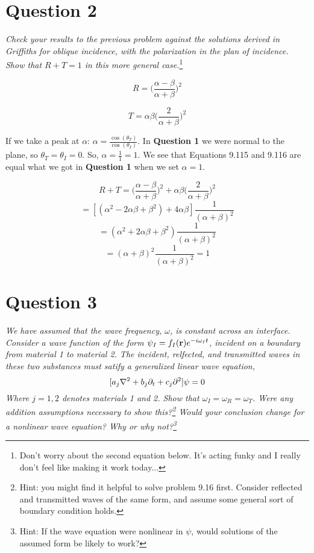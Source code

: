 \documentclass[12pt]{article}
\begin{document}
\section*{Question 2}
\emph{Check your results to the previous problem against the solutions derived in Griffiths for oblique incidence, with the polarization in the plan of incidence. Show that $R + T = 1$ in this more general case.}\footnote{Don't worry about the second equation below. It's acting funky and I really don't feel like making it work today...}\bigskip

\begin{equation}
	\tag{Equation 9.115}
	R = \Big(\frac{\alpha - \beta}{\alpha + \beta}\Big)^2
	\label{eq:9.115}
\end{equation}

\begin{equation}
	\tag{Equation 9.116}
	T = \alpha \beta \Big(\frac{2}{\alpha + \beta}\Big)^2
	\label{eq:9.116}
\end{equation}

If we take a peak at $\alpha$: $\alpha = \frac{\cos(\theta_T)}{\cos(\theta_I)}$. In \textbf{Question 1} we were normal to the plane, so $\theta_T = \theta_I = 0$. So, $\alpha = \frac{1}{1} = 1$. We see that Equations 9.115 and 9.116 are equal what we got in \textbf{Question 1} when we set $\alpha = 1$.\bigskip

\[R + T = \Big(\frac{\alpha - \beta}{\alpha + \beta}\Big)^2 + \alpha \beta \Big(\frac{2}{\alpha + \beta}\Big)^2\]
\[ = [(\alpha^2 - 2\alpha\beta + \beta^2) + 4 \alpha \beta]\frac{1}{(\alpha + \beta)^2}\]
\[ = (\alpha^2 + 2\alpha\beta + \beta^2)\frac{1}{(\alpha + \beta)^2}\]
\[= (\alpha + \beta)^2 \frac{1}{(\alpha + \beta)^2} = 1\]




\newpage

\section*{Question 3}
\emph{We have assumed that the wave frequency, $\omega$, is constant across an interface. Consider a wave function of the form $\psi_I = f_I(\vb{r})e^{-i\omega_I t}$, incident on a boundary from material 1 to material 2. The incident, relfected, and transmitted waves in these two substances must satify a generalized linear wave equation,}
\[[a_j\laplacian + b_j \partial_t + c_j\partial^2]\psi = 0\]
\emph{Where $j=1,2$ denotes materials 1 and 2. Show that $\omega_I = \omega_R =\omega_T$. Were any addition assumptions necessary to show this?\footnote{Hint: you might find it helpful to solve problem 9.16 first. Consider reflected and transmitted waves of the same form, and assume some general sort of boundary condition holds.} Would your conclusion change for a nonlinear wave equation? Why or why not?\footnote{Hint: If the wave equation were nonlinear in $\psi$, would solutions of the assumed form be likely to work?}}\bigskip
\end{document}
